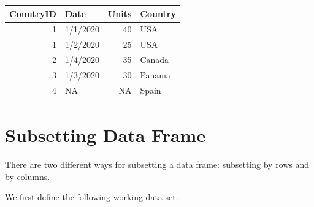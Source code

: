 \documentclass[
]{book}
\begin{document}
\begin{tabular}{r|l|r|l}
\hline
CountryID & Date & Units & Country\\
\hline
1 & 1/1/2020 & 40 & USA\\
\hline
1 & 1/2/2020 & 25 & USA\\
\hline
2 & 1/4/2020 & 35 & Canada\\
\hline
3 & 1/3/2020 & 30 & Panama\\
\hline
4 & NA & NA & Spain\\
\hline
\end{tabular}

\hfill\break

\hypertarget{subsetting-data-frame}{%
\section{Subsetting Data Frame}\label{subsetting-data-frame}}

There are two different ways for subsetting a data frame: subsetting by rows and by columns.

We first define the following working data set.
\end{document}
